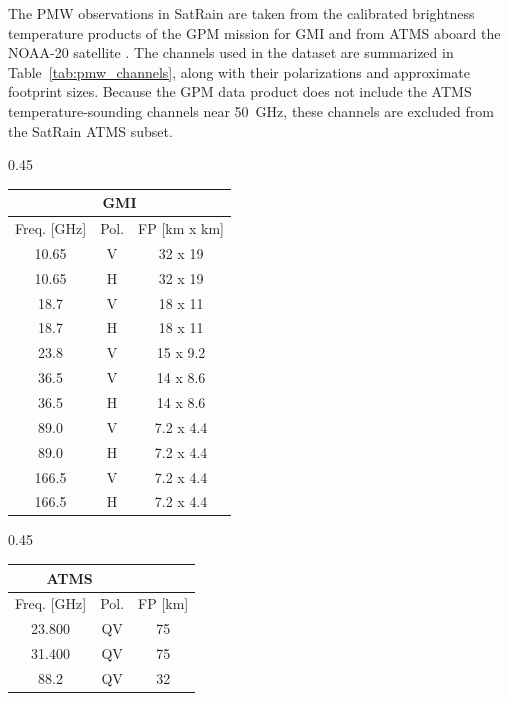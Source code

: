 \documentclass[11pt]{article}
\begin{document}
The PMW observations in SatRain are taken from the calibrated brightness
temperature products of the GPM mission for GMI \citep{Berg2022_GMI_L1C_R_V07}
and from ATMS aboard the NOAA-20 satellite \citep{Berg2022_ATMS_NOAA20_1C_V07}.
The channels used in the dataset are summarized in Table~\ref{tab:pmw_channels},
along with their polarizations and approximate footprint sizes. Because the GPM
data product does not include the ATMS temperature-sounding channels near
\SI{50}{\giga\hertz}, these channels are excluded from the SatRain ATMS
subset.

\begin{table}[htbp]
	\centering
	\begin{subtable}{0.45\textwidth}
		\centering
		\begin{tabular}{ccc}
			\multicolumn{3}{c}{GMI}           \\[0.5ex]
			\toprule
			Freq. [GHz] & Pol. & FP [km x km] \\
			\midrule
			10.65       & V    & 32 x 19      \\
			10.65       & H    & 32 x 19      \\
			18.7        & V    & 18 x 11      \\
			18.7        & H    & 18 x 11      \\
			23.8        & V    & 15 x 9.2     \\
			36.5        & V    & 14 x 8.6     \\
			36.5        & H    & 14 x 8.6     \\
			89.0        & V    & 7.2 x 4.4    \\
			89.0        & H    & 7.2 x 4.4    \\
			166.5       & V    & 7.2 x 4.4    \\
			166.5       & H    & 7.2 x 4.4    \\
			\bottomrule
		\end{tabular}
	\end{subtable}%
	\hfill%
	\begin{subtable}{0.45\textwidth}
		\centering
		\begin{tabular}{ccc}
			\multicolumn{2}{c}{ATMS}          \\[0.5ex]
			\toprule
			Freq. [GHz]      & Pol. & FP [km] \\
			\midrule
			23.800           & QV   & 75      \\
			31.400           & QV   & 75      \\
			88.2             & QV   & 32      \\

\end{tabular}
\end{subtable}
\end{table}
\end{document}
